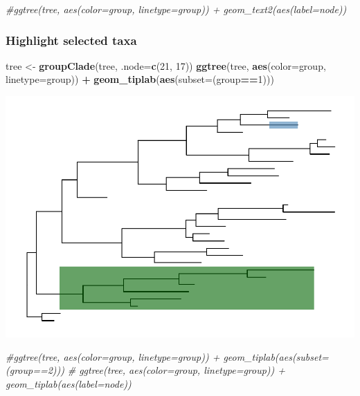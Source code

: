 \documentclass[]{article}
\newenvironment{Shaded}{\begin{snugshade}}{\end{snugshade}}
\newcommand{\KeywordTok}[1]{\textcolor[rgb]{0.13,0.29,0.53}{\textbf{#1}}}
\newcommand{\DataTypeTok}[1]{\textcolor[rgb]{0.13,0.29,0.53}{#1}}
\newcommand{\DecValTok}[1]{\textcolor[rgb]{0.00,0.00,0.81}{#1}}
\newcommand{\StringTok}[1]{\textcolor[rgb]{0.31,0.60,0.02}{#1}}
\newcommand{\CommentTok}[1]{\textcolor[rgb]{0.56,0.35,0.01}{\textit{#1}}}
\newcommand{\OperatorTok}[1]{\textcolor[rgb]{0.81,0.36,0.00}{\textbf{#1}}}
\newcommand{\NormalTok}[1]{#1}
\begin{document}
\begin{Shaded}
\begin{Highlighting}[]
\CommentTok{#ggtree(tree, aes(color=group, linetype=group)) + geom_text2(aes(label=node))}
\end{Highlighting}
\end{Shaded}

\subsubsection{Highlight selected taxa}\label{highlight-selected-taxa}

\begin{Shaded}
\begin{Highlighting}[]
\NormalTok{tree <-}\StringTok{ }\KeywordTok{groupClade}\NormalTok{(tree, }\DataTypeTok{.node=}\KeywordTok{c}\NormalTok{(}\DecValTok{21}\NormalTok{, }\DecValTok{17}\NormalTok{))}
\KeywordTok{ggtree}\NormalTok{(tree, }\KeywordTok{aes}\NormalTok{(}\DataTypeTok{color=}\NormalTok{group, }\DataTypeTok{linetype=}\NormalTok{group)) }\OperatorTok{+}\StringTok{ }\KeywordTok{geom_tiplab}\NormalTok{(}\KeywordTok{aes}\NormalTok{(}\DataTypeTok{subset=}\NormalTok{(group}\OperatorTok{==}\DecValTok{1}\NormalTok{)))}
\end{Highlighting}
\end{Shaded}

\includegraphics{ggtree_files/figure-latex/unnamed-chunk-15-1.pdf}

\begin{Shaded}
\begin{Highlighting}[]
\CommentTok{#ggtree(tree, aes(color=group, linetype=group)) + geom_tiplab(aes(subset=(group==2)))}
\CommentTok{# ggtree(tree, aes(color=group, linetype=group)) + geom_tiplab(aes(label=node))}
\end{Highlighting}
\end{Shaded}
\end{document}

